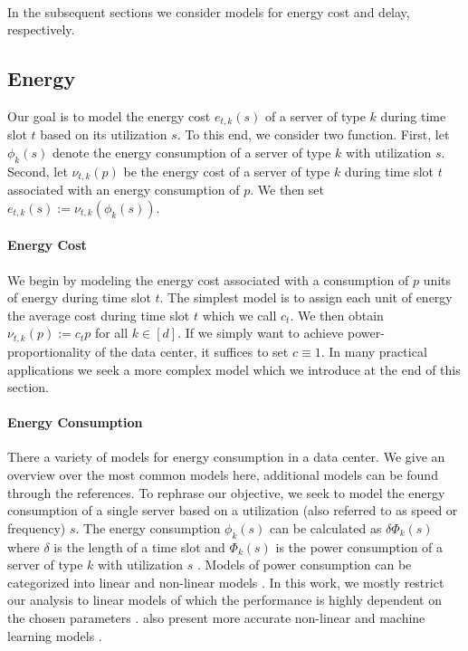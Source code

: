 \paragraph{}{In the subsequent sections we consider models for energy cost and delay, respectively.}

\subsection{Energy}\label{section:application:operating_cost:energy}

Our goal is to model the energy cost $e_{t,k}(s)$ of a server of type $k$ during time slot $t$ based on its utilization $s$. To this end, we consider two function. First, let $\phi_k(s)$ denote the energy consumption of a server of type $k$ with utilization $s$. Second, let $\nu_{t,k}(p)$ be the energy cost of a server of type $k$ during time slot $t$ associated with an energy consumption of $p$. We then set $e_{t,k}(s) := \nu_{t,k}(\phi_k(s))$.

\paragraph{Energy Cost} We begin by modeling the energy cost associated with a consumption of $p$ units of energy during time slot $t$. The simplest model is to assign each unit of energy the average cost during time slot $t$ which we call $c_t$. We then obtain $\nu_{t,k}(p) := c_t p$ for all $k \in [d]$. If we simply want to achieve power-proportionality of the data center, it suffices to set $c \equiv 1$. In many practical applications we seek a more complex model which we introduce at the end of this section.

\paragraph{Energy Consumption} There a variety of models for energy consumption in a data center. We give an overview over the most common models here, additional models can be found through the references. To rephrase our objective, we seek to model the energy consumption of a single server based on a utilization (also referred to as speed or frequency) $s$. The energy consumption $\phi_k(s)$ can be calculated as $\delta \Phi_k(s)$ where $\delta$ is the length of a time slot and $\Phi_k(s)$ is the power consumption of a server of type $k$ with utilization $s$ \cite{Dayarathna2016}. Models of power consumption can be categorized into linear and non-linear models \cite{Ismail2020}. In this work, we mostly restrict our analysis to linear models of which the performance is highly dependent on the chosen parameters \cite{Ismail2020}. \citeauthor*{Ismail2020} also present more accurate non-linear and machine learning models \cite{Ismail2020}.

